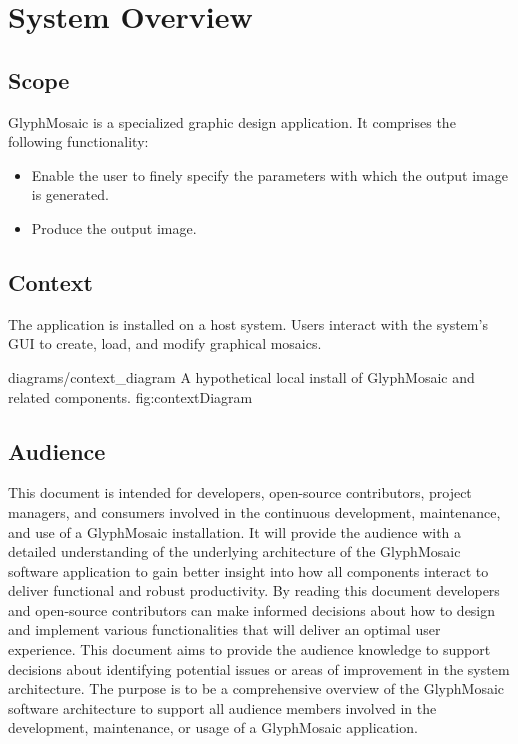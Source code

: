 \section{System Overview}
\subsection{Scope}
GlyphMosaic is a specialized graphic design application.
It comprises the following functionality:
\begin{itemize}
  \item Enable the user to finely specify the parameters with which the output image is generated.
  \item Produce the output image.
\end{itemize}


\subsection{Context}
The application is installed on a host system.
Users interact with the system's GUI to create, load, and modify graphical mosaics.

\sidiagram
{diagrams/context_diagram}
{A hypothetical local install of GlyphMosaic and related components.}
{fig:contextDiagram}
{\diagsize}


\subsection{Audience}
This document is intended for developers, open-source contributors, project managers, and consumers involved in the continuous development, maintenance, and use of a GlyphMosaic installation. 
It will provide the audience with a detailed understanding of the underlying architecture of the GlyphMosaic software application to gain better insight into how all components interact to deliver functional and robust productivity.
By reading this document developers and open-source contributors can make informed decisions about how to design and implement various functionalities that will deliver an optimal user experience.
This document aims to provide the audience knowledge to support decisions about identifying potential issues or areas of improvement in the system architecture.
The purpose is to be a comprehensive overview of the GlyphMosaic software architecture to support all audience members involved in the development, maintenance, or usage of a GlyphMosaic application.



